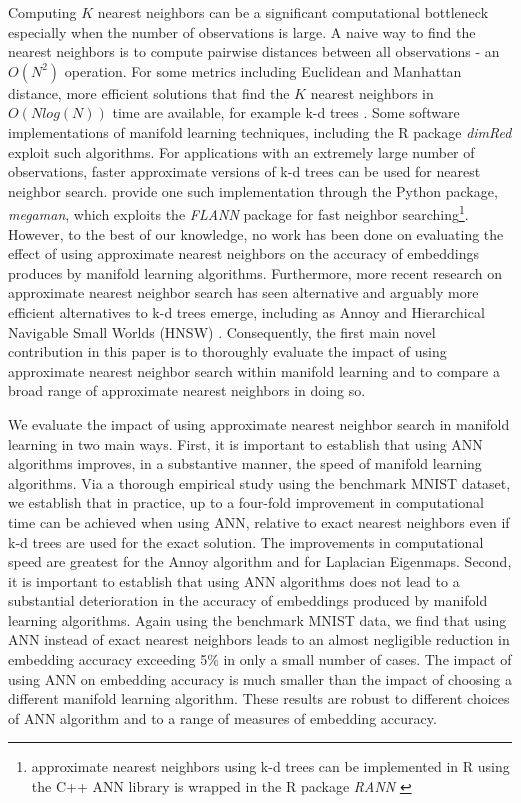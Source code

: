 \documentclass[11pt,a4paper,]{article}
\begin{document}
Computing \(K\) nearest neighbors can be a significant computational bottleneck especially when the number of observations is large. A naive way to find the nearest neighbors is to compute pairwise distances between all observations - an \(O(N^2)\) operation. For some metrics including Euclidean and Manhattan distance, more efficient solutions that find the \(K\) nearest neighbors in \(O(Nlog(N))\) time are available, for example k-d trees \autocite{Bentley1975-zo}. Some software implementations of manifold learning techniques, including the R package \emph{dimRed} \autocite{Kraemer2018-zf} exploit such algorithms. For applications with an extremely large number of observations, faster approximate versions of k-d trees can be used for nearest neighbor search. \textcite{McQueen2016-xz} provide one such implementation through the Python package, \emph{megaman}, which exploits the \emph{FLANN} \autocite{Muja2009-de} package for fast neighbor searching\footnote{approximate nearest neighbors using k-d trees can be implemented in R using the C++ ANN library \autocite{mount2010-ann} is wrapped in the R package \emph{RANN} \autocite{jefferislab2019-l2}}. However, to the best of our knowledge, no work has been done on evaluating the effect of using approximate nearest neighbors on the accuracy of embeddings produces by manifold learning algorithms. Furthermore, more recent research on approximate nearest neighbor search has seen alternative and arguably more efficient alternatives to k-d trees emerge, including as Annoy \autocite{Bernhardsson2016-tf} and Hierarchical Navigable Small Worlds (HNSW) \autocite{Malkov2020-jp}. Consequently, the first main novel contribution in this paper is to thoroughly evaluate the impact of using approximate nearest neighbor search within manifold learning and to compare a broad range of approximate nearest neighbors in doing so.

We evaluate the impact of using approximate nearest neighbor search in manifold learning in two main ways. First, it is important to establish that using ANN algorithms improves, in a substantive manner, the speed of manifold learning algorithms. Via a thorough empirical study using the benchmark MNIST dataset, we establish that in practice, up to a four-fold improvement in computational time can be achieved when using ANN, relative to exact nearest neighbors even if k-d trees are used for the exact solution. The improvements in computational speed are greatest for the Annoy algorithm and for Laplacian Eigenmaps. Second, it is important to establish that using ANN algorithms does not lead to a substantial deterioration in the accuracy of embeddings produced by manifold learning algorithms. Again using the benchmark MNIST data, we find that using ANN instead of exact nearest neighbors leads to an almost negligible reduction in embedding accuracy exceeding 5\% in only a small number of cases. The impact of using ANN on embedding accuracy is much smaller than the impact of choosing a different manifold learning algorithm. These results are robust to different choices of ANN algorithm and to a range of measures of embedding accuracy.
\end{document}
